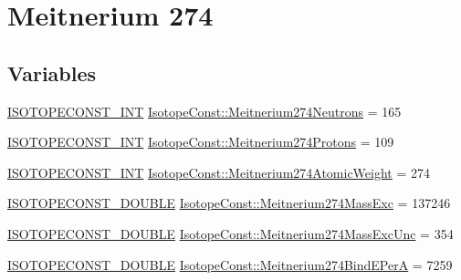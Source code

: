 \hypertarget{group___isotope_const-_meitnerium-_mt274}{}\section{Meitnerium 274}
\label{group___isotope_const-_meitnerium-_mt274}
\subsection*{Variables}
\begin{DoxyCompactItemize}
\item 
\mbox{\hyperlink{group___isotope_const-_macros_ga5f18360b3e99483a35c32d789e62621c}{I\+S\+O\+T\+O\+P\+E\+C\+O\+N\+S\+T\+\_\+\+I\+NT}} \mbox{\hyperlink{group___isotope_const-_meitnerium-_mt274_ga9ac1b54bad27524aadbe054e96f36e44}{Isotope\+Const\+::\+Meitnerium274\+Neutrons}} = 165
\item 
\mbox{\hyperlink{group___isotope_const-_macros_ga5f18360b3e99483a35c32d789e62621c}{I\+S\+O\+T\+O\+P\+E\+C\+O\+N\+S\+T\+\_\+\+I\+NT}} \mbox{\hyperlink{group___isotope_const-_meitnerium-_mt274_gaafa0761c1d597b8ae19b46962a7c8b8d}{Isotope\+Const\+::\+Meitnerium274\+Protons}} = 109
\item 
\mbox{\hyperlink{group___isotope_const-_macros_ga5f18360b3e99483a35c32d789e62621c}{I\+S\+O\+T\+O\+P\+E\+C\+O\+N\+S\+T\+\_\+\+I\+NT}} \mbox{\hyperlink{group___isotope_const-_meitnerium-_mt274_ga84c91e05d8a47e184ddbd51561fa7746}{Isotope\+Const\+::\+Meitnerium274\+Atomic\+Weight}} = 274
\item 
\mbox{\hyperlink{group___isotope_const-_macros_ga8f45a7272ce02c0b4c65c44636ed719a}{I\+S\+O\+T\+O\+P\+E\+C\+O\+N\+S\+T\+\_\+\+D\+O\+U\+B\+LE}} \mbox{\hyperlink{group___isotope_const-_meitnerium-_mt274_gae4fccbfdde86c1e17242dcf081588981}{Isotope\+Const\+::\+Meitnerium274\+Mass\+Exc}} = 137246
\item 
\mbox{\hyperlink{group___isotope_const-_macros_ga8f45a7272ce02c0b4c65c44636ed719a}{I\+S\+O\+T\+O\+P\+E\+C\+O\+N\+S\+T\+\_\+\+D\+O\+U\+B\+LE}} \mbox{\hyperlink{group___isotope_const-_meitnerium-_mt274_ga1e8fefcca8809170ec9a8b7fb7ba59aa}{Isotope\+Const\+::\+Meitnerium274\+Mass\+Exc\+Unc}} = 354
\item 
\mbox{\hyperlink{group___isotope_const-_macros_ga8f45a7272ce02c0b4c65c44636ed719a}{I\+S\+O\+T\+O\+P\+E\+C\+O\+N\+S\+T\+\_\+\+D\+O\+U\+B\+LE}} \mbox{\hyperlink{group___isotope_const-_meitnerium-_mt274_gaf105473aefb0959cf1b71a209092b3e3}{Isotope\+Const\+::\+Meitnerium274\+Bind\+E\+PerA}} = 7259
\item 

\end{DoxyCompactItemize}
